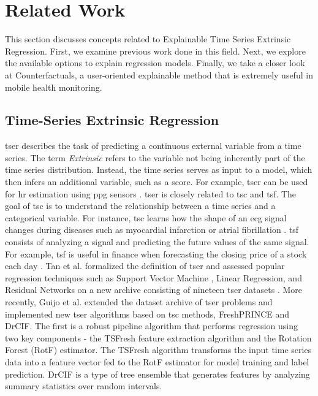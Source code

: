 \section{Related Work}
\label{sec:related-work}


This section discusses concepts related to Explainable Time Series Extrinsic Regression. First, we examine previous work done in this field. Next, we explore the available options to explain regression models. Finally, we take a closer look at Counterfactuals, a user-oriented explainable method that is extremely useful in mobile health monitoring.

\subsection{Time-Series Extrinsic Regression}

\gls{tser} describes the task of predicting a continuous external variable from a time series. The term \textit{Extrinsic} refers to the variable not being inherently part of the time series distribution. Instead, the time series serves as input to a model, which then infers an additional variable, such as a score. For example, \gls{tser} can be used for \gls{hr} estimation using \gls{ppg} sensors \cite{reiss_deep_2019}. \gls{tser} is closely related to \gls{tsc} and \gls{tsf}. The goal of \gls{tsc} is to understand the relationship between a time series and a categorical variable. For instance, \gls{tsc} learns how the shape of an \gls{ecg} signal changes during diseases such as myocardial infarction or atrial fibrillation \cite{hagiwara_computer-aided_2018}. \gls{tsf} consists of analyzing a signal and predicting the future values of the same signal. For example, \gls{tsf} is useful in finance when forecasting the closing price of a stock each day \cite{sezer_financial_2020}. 
Tan et al. \cite{tan_time_2021} formalized the definition of \gls{tser} and assessed popular regression techniques such as Support Vector Machine \cite{drucker_support_1997}, Linear Regression, and Residual Networks \cite{wang_time_2016} on a new archive consisting of nineteen \gls{tser} datasets \cite{tan_monash_2020}.
More recently, Guijo et al. \cite{guijo-rubio_unsupervised_2023} extended the dataset archive \cite{tan_monash_2020} of \gls{tser} problems and implemented new \gls{tser} algorithms based on \gls{tsc} methods, FreshPRINCE and DrCIF. The first is a robust pipeline algorithm that performs regression using two key components - the TSFresh feature extraction algorithm and the Rotation Forest (RotF) \cite{rodriguez_rotation_2006} estimator. The TSFresh algorithm transforms the input time series data into a feature vector fed to the RotF estimator for model training and label prediction. DrCIF is a type of tree ensemble that generates features by analyzing summary statistics over random intervals.


